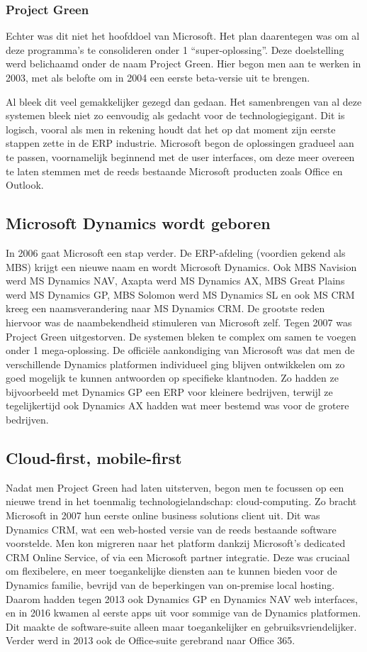 \subsubsection{Project Green }
Echter was dit niet het hoofddoel van Microsoft. Het plan daarentegen was om al deze programma’s te consolideren onder 1 “super-oplossing”. Deze doelstelling werd belichaamd onder de naam Project Green. Hier begon men aan te werken in 2003, met als belofte om in 2004 een eerste beta-versie uit te brengen. 

Al bleek dit veel gemakkelijker gezegd dan gedaan. Het samenbrengen van al deze systemen bleek niet zo eenvoudig als gedacht voor de technologiegigant. Dit is logisch, vooral als men in rekening houdt dat het op dat moment zijn eerste stappen zette in de ERP industrie. Microsoft begon de oplossingen gradueel aan te passen, voornamelijk beginnend met de user interfaces, om deze meer overeen te laten stemmen met de reeds bestaande Microsoft producten zoals Office en Outlook. 


\subsection{Microsoft Dynamics wordt geboren}
In 2006 gaat Microsoft een stap verder. De ERP-afdeling (voordien gekend als MBS) krijgt een nieuwe naam en wordt Microsoft Dynamics. Ook MBS Navision werd MS Dynamics NAV, Axapta werd MS Dynamics AX, MBS Great Plains werd MS Dynamics GP, MBS Solomon werd MS Dynamics SL en ook MS CRM kreeg een naamsverandering naar MS Dynamics CRM. De grootste reden hiervoor was de naambekendheid stimuleren van Microsoft zelf.
Tegen 2007 was Project Green uitgestorven. De systemen bleken te complex om samen te voegen onder 1 mega-oplossing. De officiële aankondiging van Microsoft was dat men de verschillende Dynamics platformen individueel ging blijven ontwikkelen om zo goed mogelijk te kunnen antwoorden op specifieke klantnoden. Zo hadden ze bijvoorbeeld met Dynamics GP een ERP voor kleinere bedrijven, terwijl ze tegelijkertijd ook Dynamics AX hadden wat meer bestemd was voor de grotere bedrijven.   


\subsection{Cloud-first, mobile-first}
Nadat men Project Green had laten uitsterven, begon men te focussen op een nieuwe trend in het toenmalig technologielandschap: cloud-computing.  
Zo bracht Microsoft in 2007 hun eerste online business solutions client uit. Dit was Dynamics CRM, wat een web-hosted versie van de reeds bestaande software voorstelde. Men kon migreren naar het platform dankzij Microsoft’s dedicated CRM Online Service, of via een Microsoft partner integratie. Deze was cruciaal om flexibelere, en meer toegankelijke diensten aan te kunnen bieden voor de Dynamics familie, bevrijd van de beperkingen van on-premise local hosting. 
Daarom hadden tegen 2013 ook Dynamics GP en Dynamics NAV web interfaces, en in 2016 kwamen al eerste apps uit voor sommige van de Dynamics platformen. Dit maakte de software-suite alleen maar toegankelijker en gebruiksvriendelijker. Verder werd in 2013 ook de Office-suite gerebrand naar Office 365.  


